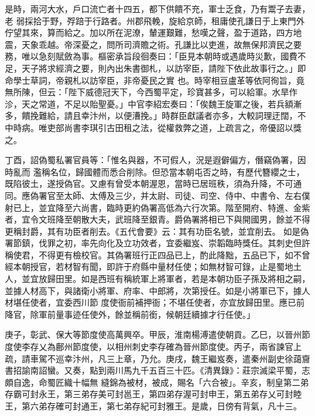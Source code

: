 \begin{pinyinscope}
 是時，兩河大水，戶口流亡者十四五，都下供饋不充，軍士乏食，乃有鬻子去妻，老
 弱採拾于野，殍踣于行路者。州郡飛輓，旋給京師，租庸使孔謙日于上東門外佇望其來，算而給之。加以所在泥潦，輦運艱難，愁嘆之聲，盈于道路，四方地震，天象乖越。帝深憂之，問所司濟贍之術。孔謙比以吏進，故無保邦濟民之要務，唯以急刻賦斂為事。樞密承旨段徊奏曰：「臣見本朝時或遇歲時災歉，國費不足，天子將求經濟之要，則內出朱書御札，以訪宰臣，請陛下依此故事行之。」即命學士草詞，帝親札以訪宰臣，非帝憂民之實
 也。時宰相豆盧革等依阿徇旨，竟無所陳，但云：「陛下威德冠天下，今西蜀平定，珍寶甚多，可以給軍。水旱作沴，天之常道，不足以貽聖憂。」中官李紹宏奏曰：「俟魏王旋軍之後，若兵額漸多，饋挽難給，請且幸汴州，以便漕挽。」時群臣獻議者亦多，大較詞理迂闊，不中時病。唯吏部尚書李琪引古田租之法，從權救弊之道，上疏言之，帝優詔以獎之。



 丁酉，詔偽蜀私署官員等：「惟名與器，不可假人，況是遐僻偏方，僭竊偽署，因時亂而
 濫稱名位，歸國體而悉合削除。但恐當本朝屯否之時，有歷代簪纓之士，既陷彼土，遂授偽官。又慮有曾受本朝渥恩，當時已居班秩，須為升降，不可通同。應偽署官至太師、太傅及三少，并太尉、司徒、司空、侍中、中書令、左右僕射已上，並宜降至六尚書，臨時更約偽署高低為六行次第。階至開府、特進、金紫者，宜令文班降至朝散大夫，武班降至銀青。爵偽署將相已下與開國男，餘並不得更稱封爵，其有功臣者削去。《五代會要》云：其有功臣名號，並宜削去。
 如是偽署節鎮，伐罪之初，率先向化及立功效者，宜委繼岌、崇韜臨時獎任。其刺史但許稱使君，不得更有檢校官。其偽署班行正四品已上，酌此降黜，五品已下，如不曾經本朝授官，若材智有聞，即許于府縣中量材任使；如無材智可錄，止是蜀地土人，並宜放歸田里。如是西班有稱統軍上將軍者，若是本朝功臣子孫及將相之嗣，並據人材高下，與諸衛小將軍、府率、中郎將，次第授任。如是小將軍已下，據人材堪任使者，宜委西川節
 度使衙前補押衙；不堪任使者，亦宜放歸田里。應已前降官，除軍前量事迹任使外，餘並稱前銜，候朝廷續據才行任使。」



 庚子，彰武、保大等節度使高萬興卒。甲辰，淮南楊溥遣使朝貢。乙巳，以晉州節度使李存乂為鄜州節度使，以相州刺史李存確為晉州節度使。丙子，兩省諫官上疏，請車駕不巡幸汴州，凡三上章，乃允。庚戌，魏王繼岌奏，遣秦州副史徐藹齎書招諭南詔蠻。又奏，點到兩川馬九千五百三十匹。《清異錄》：莊宗滅梁平蜀，志頗自逸，命蜀匠織十幅無
 縫錦為被材，被成，賜名「六合被」。辛亥，制皇第二弟存霸可封永王，第三弟存美可封邕王，第四弟存渥可封申王，第五弟存乂可封睦王，第六弟存確可封通王，第七弟存紀可封雅王。是歲，日傍有背氣，凡十三。



\end{pinyinscope}